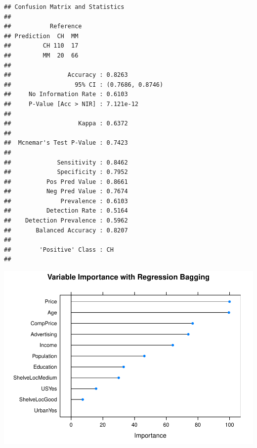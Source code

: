 \documentclass[
]{book}
\newenvironment{Shaded}{\begin{snugshade}}{\end{snugshade}}
\newcommand{\CommentTok}[1]{\textcolor[rgb]{0.56,0.35,0.01}{\textit{#1}}}
\newcommand{\DataTypeTok}[1]{\textcolor[rgb]{0.13,0.29,0.53}{#1}}
\newcommand{\DecValTok}[1]{\textcolor[rgb]{0.00,0.00,0.81}{#1}}
\newcommand{\KeywordTok}[1]{\textcolor[rgb]{0.13,0.29,0.53}{\textbf{#1}}}
\newcommand{\NormalTok}[1]{#1}
\newcommand{\OperatorTok}[1]{\textcolor[rgb]{0.81,0.36,0.00}{\textbf{#1}}}
\newcommand{\StringTok}[1]{\textcolor[rgb]{0.31,0.60,0.02}{#1}}
\begin{document}
\begin{verbatim}
## Confusion Matrix and Statistics
## 
##           Reference
## Prediction  CH  MM
##         CH 110  17
##         MM  20  66
##                                           
##                Accuracy : 0.8263          
##                  95% CI : (0.7686, 0.8746)
##     No Information Rate : 0.6103          
##     P-Value [Acc > NIR] : 7.121e-12       
##                                           
##                   Kappa : 0.6372          
##                                           
##  Mcnemar's Test P-Value : 0.7423          
##                                           
##             Sensitivity : 0.8462          
##             Specificity : 0.7952          
##          Pos Pred Value : 0.8661          
##          Neg Pred Value : 0.7674          
##              Prevalence : 0.6103          
##          Detection Rate : 0.5164          
##    Detection Prevalence : 0.5962          
##       Balanced Accuracy : 0.8207          
##                                           
##        'Positive' Class : CH              
## 
\end{verbatim}

\begin{Shaded}
\end{Shaded}

\includegraphics{data-sci_files/figure-latex/unnamed-chunk-83-2.pdf}
\end{document}
